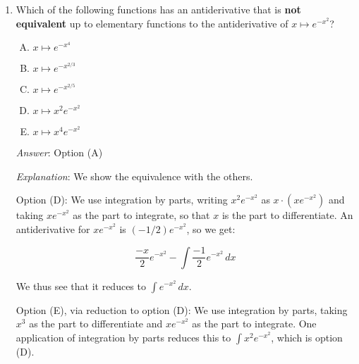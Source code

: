 \documentclass[10pt]{amsart}
\begin{document}
\begin{enumerate}
  {\em Explanation}: Integration of $f_3$ is a standard procedure, so
  we say nothing about that. As for $f_2$, recall that integrating
  $f(x^{1/k})$ is equivalent to integrating $u^{k-1}f(u)$ where $u =
  x^{1/k}$, which in turn is equivalent to integrating $f$ $k$
  times. Since $\sin$ can be integrated as many times as we wish,
  $f_2$ can be integrated.

  The reason why $f_1$ and $f_4$ are not elementarily integrable is
  subtler but it's clear that none of the obvious methods work.

  {\em Performance review}: $20$ out of $25$ people got this. $2$
  chose (B), $1$ each chose (A), (C), and (E).

  {\em Historical note (last time)}: $5$ out of $18$ people got this
  correct. $5$ people each chose (B) and (E), $2$ chose (C), $1$ chose
  (A).


\item Which of the following functions has an antiderivative that is
  {\bf not equivalent} up to elementary functions to the antiderivative of
  $x \mapsto e^{-x^2}$?

  \begin{enumerate}[(A)]
  \item $x \mapsto e^{-x^4}$
  \item $x \mapsto e^{-x^{2/3}}$
  \item $x \mapsto e^{-x^{2/5}}$
  \item $x \mapsto x^2e^{-x^2}$
  \item $x \mapsto x^4e^{-x^2}$
  \end{enumerate}

  {\em Answer}: Option (A)

  {\em Explanation}: We show the equivalence with the others.

  Option (D): We use integration by parts, writing
  $x^2e^{-x^2}$ as $x \cdot (xe^{-x^2})$ and taking $xe^{-x^2}$ as the
  part to integrate, so that $x$ is the part to differentiate. An
  antiderivative for $xe^{-x^2}$ is $(-1/2)e^{-x^2}$, so we get:

  $$\frac{-x}{2}e^{-x^2} - \int \frac{-1}{2}e^{-x^2} \, dx$$

  We thus see that it reduces to $\int e^{-x^2} \, dx$.

  Option (E), via reduction to option (D): We use integration by
  parts, taking $x^3$ as the part to differentiate and $xe^{-x^2}$ as
  the part to integrate. One application of integration by parts
  reduces this to $\int x^2e^{-x^2}$, which is option (D).


\end{enumerate}
\end{document}

